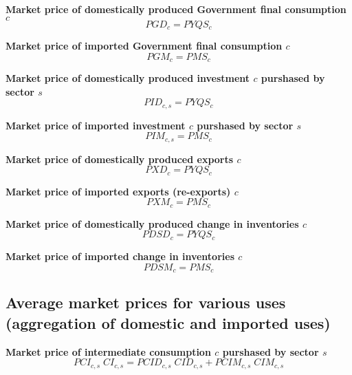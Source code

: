 \documentclass[12pt]{article}
\numberwithin{equation}{section}
\begin{document}
\noindent \textbf{Market price of domestically produced Government final consumption $c$} 
\begin{dmath}
PGD_{c} = PYQS_{c}
\label{prices.mdlPGD[c]}
\end{dmath}

\noindent \textbf{Market price of imported Government final consumption $c$} 
\begin{dmath}
PGM_{c} = PMS_{c}
\label{prices.mdlPGM[c]}
\end{dmath}

\noindent \textbf{Market price of domestically produced investment $c$ purshased by sector $s$} 
\begin{dmath}
PID_{c, s} = PYQS_{c}
\label{prices.mdlPID[c, s]}
\end{dmath}

\noindent \textbf{Market price of imported investment $c$ purshased by sector $s$} 
\begin{dmath}
PIM_{c, s} = PMS_{c}
\label{prices.mdlPIM[c, s]}
\end{dmath}

\noindent \textbf{Market price of domestically produced exports $c$} 
\begin{dmath}
PXD_{c} = PYQS_{c}
\label{prices.mdlPXD[c]}
\end{dmath}

\noindent \textbf{Market price of imported exports (re-exports) $c$} 
\begin{dmath}
PXM_{c} = PMS_{c}
\label{prices.mdlPXM[c]}
\end{dmath}

\noindent \textbf{Market price of domestically produced change in inventories $c$} 
\begin{dmath}
PDSD_{c} = PYQS_{c}
\label{prices.mdlPDSD[c]}
\end{dmath}

\noindent \textbf{Market price of imported change in inventories $c$} 
\begin{dmath}
PDSM_{c} = PMS_{c}
\label{prices.mdlPDSM[c]}
\end{dmath}



\subsection{Average market prices for various uses (aggregation of domestic and imported uses)}



\noindent \textbf{Market price of intermediate consumption $c$ purshased by sector $s$} 
\begin{dmath}
PCI_{c, s} \; CI_{c, s} = PCID_{c, s} \; CID_{c, s} + PCIM_{c, s} \; CIM_{c, s}
\label{prices.mdlPCI[c, s]}
\end{dmath}
\end{document}

